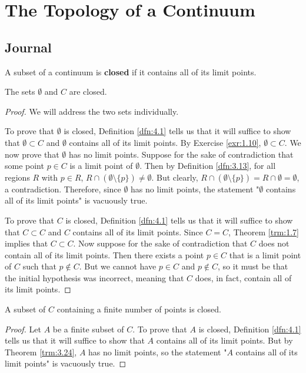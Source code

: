 \documentclass[../main.tex]{subfiles}
\begin{document}
\chapter{The Topology of a Continuum}
\section{Journal}
\begin{definition}\label{dfn:4.1}
    A subset of a continuum is \textbf{closed} if it contains all of its limit points.
\end{definition}

\begin{theorem}\label{trm:4.2}
    The sets $\emptyset$ and $C$ are closed.
    \begin{proof}
        We will address the two sets individually.\par
        To prove that $\emptyset$ is closed, Definition \ref{dfn:4.1} tells us that it will suffice to show that $\emptyset\subset C$ and $\emptyset$ contains all of its limit points. By Exercise \ref{exr:1.10}, $\emptyset\subset C$. We now prove that $\emptyset$ has no limit points. Suppose for the sake of contradiction that some point $p\in C$ is a limit point of $\emptyset$. Then by Definition \ref{dfn:3.13}, for all regions $R$ with $p\in R$, $R\cap(\emptyset\setminus\{p\})\neq\emptyset$. But clearly, $R\cap(\emptyset\setminus\{p\})=R\cap\emptyset=\emptyset$, a contradiction. Therefore, since $\emptyset$ has no limit points, the statement "$\emptyset$ contains all of its limit points" is vacuously true.\par
        To prove that $C$ is closed, Definition \ref{dfn:4.1} tells us that it will suffice to show that $C\subset C$ and $C$ contains all of its limit points. Since $C=C$, Theorem \ref{trm:1.7} implies that $C\subset C$. Now suppose for the sake of contradiction that $C$ does not contain all of its limit points. Then there exists a point $p\in C$ that is a limit point of $C$ such that $p\notin C$. But we cannot have $p\in C$ and $p\notin C$, so it must be that the initial hypothesis was incorrect, meaning that $C$ does, in fact, contain all of its limit points.
    \end{proof}
\end{theorem}

\begin{theorem}\label{trm:4.3}
    A subset of $C$ containing a finite number of points is closed.
    \begin{proof}
        Let $A$ be a finite subset of $C$. To prove that $A$ is closed, Definition \ref{dfn:4.1} tells us that it will suffice to show that $A$ contains all of its limit points. But by Theorem \ref{trm:3.24}, $A$ has no limit points, so the statement "$A$ contains all of its limit points" is vacuously true.
    \end{proof}
\end{theorem}
\end{document}
